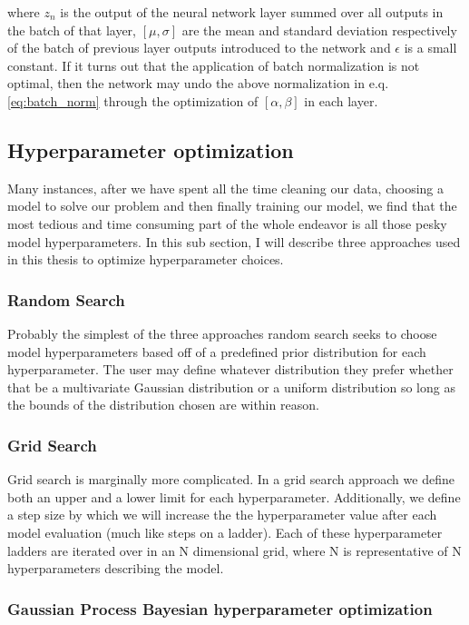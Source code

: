 where $z_n$ is the output of the neural network layer summed over all outputs in the batch of that layer, $[\mu,\sigma]$ are the mean and standard deviation respectively of the batch of previous layer outputs introduced to the network and $\epsilon$ is a small constant. If it turns out that the application of batch normalization is not optimal, then the network may undo the above normalization in e.q. \ref{eq:batch_norm} through the optimization of $[\alpha,\beta]$ in each layer.

\subsection{Hyperparameter optimization}

Many instances, after we have spent all the time cleaning our data, 
choosing a model to solve our problem and then finally 
training our model, we find that the most tedious and 
time consuming part of the whole endeavor is all those 
pesky model hyperparameters. In this sub section, I will 
describe three approaches used in this thesis to optimize 
hyperparameter choices.

\subsubsection{Random Search}
Probably the simplest of the three approaches random search 
seeks to choose model hyperparameters based off of a 
predefined prior distribution for each hyperparameter. 
The user may define whatever distribution they prefer 
whether that be a multivariate Gaussian distribution 
or a uniform distribution so long as the bounds of the 
distribution chosen are within reason.

\subsubsection{Grid Search}

Grid search is marginally more complicated. In a grid 
search approach we define both an upper and a lower limit 
for each hyperparameter. Additionally, we define a step 
size by which we will increase the the hyperparameter 
value after each model evaluation (much like steps 
on a ladder). Each of these hyperparameter 
ladders are iterated over in an N dimensional grid, 
where N is representative of N hyperparameters 
describing the model. 

\subsubsection{Gaussian Process Bayesian hyperparameter optimization}

